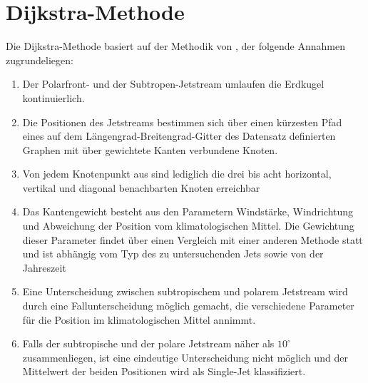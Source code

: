 
\section{Dijkstra-Methode}
Die Dijkstra-Methode basiert auf der Methodik von \citet{molnos-2017}, der folgende Annahmen zugrundeliegen:
\begin{enumerate}
  \item Der Polarfront- und der Subtropen-Jetstream umlaufen die Erdkugel kontinuierlich.
  \item Die Positionen des Jetstreams bestimmen sich über einen kürzesten Pfad eines auf dem Längengrad-Breitengrad-Gitter des Datensatz definierten Graphen mit über gewichtete Kanten verbundene Knoten.
  \item Von jedem Knotenpunkt aus sind lediglich die drei bis acht horizontal, vertikal und diagonal benachbarten Knoten erreichbar
  \item Das Kantengewicht besteht aus den Parametern Windstärke, Windrichtung und Abweichung der Position vom klimatologischen Mittel. Die Gewichtung dieser Parameter findet über einen Vergleich mit einer anderen Methode statt und ist abhängig vom Typ des zu untersuchenden Jets sowie von der Jahreszeit
  \item Eine Unterscheidung zwischen subtropischem und polarem Jetstream wird durch eine Fallunterscheidung möglich gemacht, die verschiedene Parameter für die Position im klimatologischen Mittel annimmt.
  \item Falls der subtropische und der polare Jetstream näher als $10^\circ$ zusammenliegen, ist eine eindeutige Unterscheidung nicht möglich und der Mittelwert der beiden Positionen wird als Single-Jet klassifiziert.
\end{enumerate}
